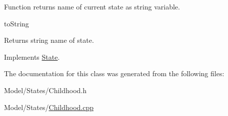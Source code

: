Function returns name of current state as string variable. 

to\+String \begin{DoxyReturn}{Returns}
string name of state. 
\end{DoxyReturn}


Implements \hyperlink{class_state_afabc279037b4526ec161e6f8988855a9}{State}.



The documentation for this class was generated from the following files\+:\begin{DoxyCompactItemize}
\item 
Model/\+States/Childhood.\+h\item 
Model/\+States/\hyperlink{_childhood_8cpp}{Childhood.\+cpp}\end{DoxyCompactItemize}
